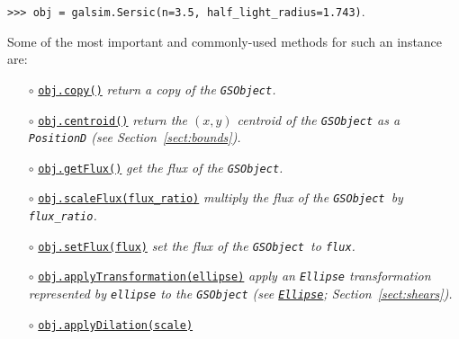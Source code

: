 \documentclass[preprint,11pt]{aastex}
\begin{document}
{\tt >>> obj = galsim.Sersic(n=3.5, half\_light\_radius=1.743)}.

Some of the most important and commonly-used methods for such an
instance are:
\begin{itemize}
\item[$\circ$]
  \href{http://galsim-developers.github.com/GalSim/classgalsim_1_1base_1_1_g_s_object.html#aa0b398d4b0fca70211e4a73f81ea7e1a}{\texttt{obj.copy()}}
  \newline \emph{return a copy of the \texttt{GSObject}.}
\item[$\circ$]
  \href{http://galsim-developers.github.com/GalSim/classgalsim_1_1base_1_1_g_s_object.html#a662d8ce421ecd90080bdcaaf6890aed8}{\texttt{obj.centroid()}}
  \newline \emph{return the $(x, y)$ centroid of the \texttt{GSObject} as a
    \texttt{PositionD} (see Section~\ref{sect:bounds}).}
\item[$\circ$]
  \href{http://galsim-developers.github.com/GalSim/classgalsim_1_1base_1_1_g_s_object.html#a662d8ce421ecd90080bdcaaf6890aed8}{\texttt{obj.getFlux()}}
  \newline \emph{get the flux of the \texttt{GSObject}.}
\item[$\circ$]\href{http://galsim-developers.github.com/GalSim/classgalsim_1_1base_1_1_g_s_object.html#af4193645a9af52e7d54a044cafec8ab9}{\texttt{obj.scaleFlux(flux\_ratio)}}
  \newline \emph{multiply the flux of the \texttt{GSObject}~by \texttt{flux\_ratio}.}
\item[$\circ$]
  \href{http://galsim-developers.github.com/GalSim/classgalsim_1_1base_1_1_g_s_object.html#a1993652591ddc802b734186391b28894}{\texttt{obj.setFlux(flux)}}
    \newline \emph{set the flux of the \texttt{GSObject}~to \texttt{flux}.}
\item[$\circ$]
\href{http://galsim-developers.github.com/GalSim/classgalsim_1_1base_1_1_g_s_object.html#ad491a1276fda07b148c6466d5dbd07b1}{\texttt{obj.applyTransformation(ellipse)}}
\newline \emph{apply an \texttt{Ellipse} transformation represented by
  \texttt{ellipse} to the \texttt{GSObject} (see \href{http://galsim-developers.github.com/GalSim/classgalsim_1_1ellipse_1_1_ellipse.html}{\texttt{Ellipse}}; Section~\ref{sect:shears}).}
\item[$\circ$]
  \href{http://galsim-developers.github.com/GalSim/classgalsim_1_1base_1_1_g_s_object.html#a4301c73bbc1491ebb170e64c509cadd5}{\texttt{obj.applyDilation(scale)}}

\end{itemize}
\end{document}
